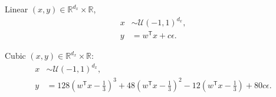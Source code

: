 \documentclass[11pt]{article}
\providecommand{\mb}[1]{\boldsymbol{#1}}
\providecommand{\mc}[1]{\mathcal{#1}}
\newcommand{\Real}{\mathbb{R}}
\newcommand{\T}{^{\ensuremath{\mathsf{T}}}}           %
\begin{document}

%
%
%
%
%
%
%
%

\setcounter{equation}{0}
\begin{compactenum}
\item Linear $(x,y) \in \Real^{d_{x}} \times \Real$,  
\begin{align*}
x &\sim \mc{U}(-1,1)^{d_{x}},\\
y &=w\T x+c\epsilon.
\end{align*}
\item Cubic $(x,y) \in \Real^{d_{x}} \times \Real$: 
\begin{align*}
x &\sim \mc{U}(-1,1)^{d_{x}}, \\ 
y &=128(w\T x-\tfrac{1}{3})^3+48(w\T x-\tfrac{1}{3})^2-12(w\T x-\tfrac{1}{3})+80c\epsilon.
\end{align*}
%
%
%
%
%
%
%
%
%
%
%
%

\end{compactenum}
\end{document}
